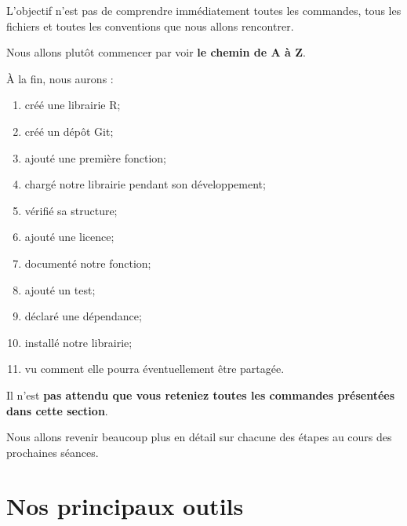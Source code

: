 \documentclass[
  letterpaper,
  DIV=11,
  numbers=noendperiod]{scrreprt}
\providecommand{\tightlist}{%
  \setlength{\itemsep}{0pt}\setlength{\parskip}{0pt}}\usepackage{longtable,booktabs,array}
\begin{document}
L'objectif n'est pas de comprendre immédiatement toutes les commandes,
tous les fichiers et toutes les conventions que nous allons rencontrer.

Nous allons plutôt commencer par voir \textbf{le chemin de A à Z}.

À la fin, nous aurons :

\begin{enumerate}
\def\labelenumi{\arabic{enumi}.}
\tightlist
\item
  créé une librairie R;
\item
  créé un dépôt Git;
\item
  ajouté une première fonction;
\item
  chargé notre librairie pendant son développement;
\item
  vérifié sa structure;
\item
  ajouté une licence;
\item
  documenté notre fonction;
\item
  ajouté un test;
\item
  déclaré une dépendance;
\item
  installé notre librairie;
\item
  vu comment elle pourra éventuellement être partagée.
\end{enumerate}

\begin{tcolorbox}[enhanced jigsaw, arc=.35mm, title=\textcolor{quarto-callout-note-color}{\faInfo}\hspace{0.5em}{Une première visite}, colback=white, left=2mm, rightrule=.15mm, toptitle=1mm, opacityback=0, bottomtitle=1mm, breakable, colframe=quarto-callout-note-color-frame, coltitle=black, toprule=.15mm, titlerule=0mm, opacitybacktitle=0.6, bottomrule=.15mm, colbacktitle=quarto-callout-note-color!10!white, leftrule=.75mm]

Il n'est \textbf{pas attendu que vous reteniez toutes les commandes
présentées dans cette section}.

Nous allons revenir beaucoup plus en détail sur chacune des étapes au
cours des prochaines séances.

\end{tcolorbox}

\section*{Nos principaux outils}\label{nos-principaux-outils}
\end{document}
